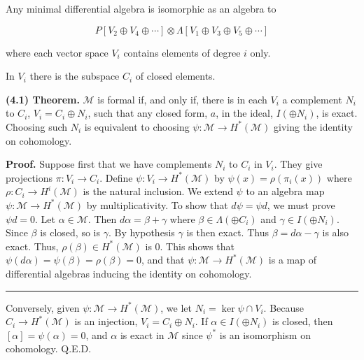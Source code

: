 \documentclass[
  english,
  a3paper,
  a3paper]{extarticle}
\begin{document}
Any minimal differential algebra is isomorphic as an algebra to

\[P[V_2\oplus V_4\oplus\cdots]\otimes\Lambda[V_1\oplus V_3\oplus V_5\oplus\cdots]\]

where each vector space \(V_i\) contains elements of degree \(i\) only.

In \(V_i\) there is the subspace \(C_i\) of closed elements.

\textbf{(4.1) Theorem.} \(\mathcal M\) is formal if, and only if, there
is in each \(V_i\) a complement \(N_i\) to \(C_i\),
\(V_i=C_i\oplus N_i\), such that any closed form, \(a\), in the ideal,
\(I(\oplus N_i)\), is exact. Choosing such \(N_i\) is equivalent to
choosing \(\psi:\mathcal M\to H^*(\mathcal M)\) giving the identity on
cohomology.

\textbf{Proof.} Suppose first that we have complements \(N_i\) to
\(C_i\) in \(V_i\). They give projections \(\pi:V_i\to C_i\). Define
\(\psi:V_i\to H^*(\mathcal M)\) by \(\psi(x)=\rho(\pi_i(x))\) where
\(\rho:C_i\to H^i(\mathcal M)\) is the natural inclusion. We extend
\(\psi\) to an algebra map \(\psi:\mathcal M\to H^*(\mathcal M)\) by
multiplicativity. To show that \(d\psi=\psi d\), we must prove
\(\psi d=0\). Let \(\alpha\in\mathcal M\). Then \(d\alpha=\beta+\gamma\)
where \(\beta\in\Lambda(\oplus C_i)\) and \(\gamma\in I(\oplus N_i)\).
Since \(\beta\) is closed, so is \(\gamma\). By hypothesis \(\gamma\) is
then exact. Thus \(\beta=d\alpha-\gamma\) is also exact. Thus,
\(\rho(\beta)\in H^*(\mathcal M)\) is 0. This shows that
\(\psi(d\alpha)=\psi(\beta)=\rho(\beta)=0\), and that
\(\psi:\mathcal M\to H^*(\mathcal M)\) is a map of differential algebras
inducing the identity on cohomology.

\clearpage



\par

\vspace{0.7mm}\hrule\vspace{1.6mm}

\fontsize{9}{11}\selectfont

Conversely, given \(\psi:\mathcal M\to H^*(\mathcal M)\), we let
\(N_i=\ker\psi\cap V_i\). Because \(C_i\to H^*(\mathcal M)\) is an
injection, \(V_i=C_i\oplus N_i\). If \(\alpha\in I(\oplus N_i)\) is
closed, then \([\alpha]=\psi(\alpha)=0\), and \(\alpha\) is exact in
\(\mathcal M\) since \(\psi^*\) is an isomorphism on cohomology. Q.E.D.
\end{document}
